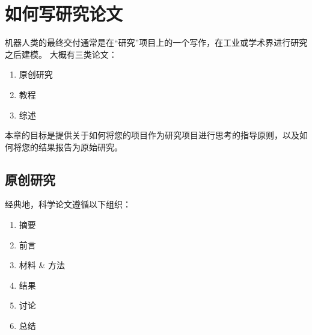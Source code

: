 
\chapter{如何写研究论文}
机器人类的最终交付通常是在“研究”项目上的一个写作，在工业或学术界进行研究之后建模。 大概有三类论文：

\begin{enumerate}

\item 原创研究
\item 教程
\item 综述
\end{enumerate}


本章的目标是提供关于如何将您的项目作为研究项目进行思考的指导原则，以及如何将您的结果报告为原始研究。


\section{原创研究}
经典地，科学论文遵循以下组织：

\begin{enumerate}

\item 摘要
\item 前言
\item 材料 \& 方法
\item 结果
\item 讨论
\item 总结
\end{enumerate}

